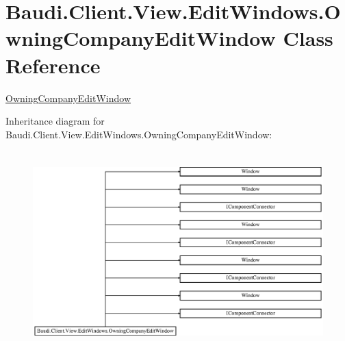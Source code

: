 \hypertarget{class_baudi_1_1_client_1_1_view_1_1_edit_windows_1_1_owning_company_edit_window}{}\section{Baudi.\+Client.\+View.\+Edit\+Windows.\+Owning\+Company\+Edit\+Window Class Reference}
\label{class_baudi_1_1_client_1_1_view_1_1_edit_windows_1_1_owning_company_edit_window}


\hyperlink{class_baudi_1_1_client_1_1_view_1_1_edit_windows_1_1_owning_company_edit_window}{Owning\+Company\+Edit\+Window}  


Inheritance diagram for Baudi.\+Client.\+View.\+Edit\+Windows.\+Owning\+Company\+Edit\+Window\+:\begin{figure}[H]
\begin{center}
\leavevmode
\includegraphics[height=7.777778cm]{class_baudi_1_1_client_1_1_view_1_1_edit_windows_1_1_owning_company_edit_window}
\end{center}
\end{figure}

